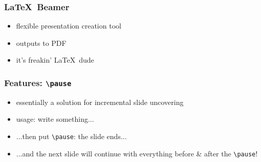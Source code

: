\newcommand{\cmdverb}[1]{\texttt{\textbackslash #1}}

\begin{frame}\frametitle{\LaTeX\ Beamer}
\begin{itemize}
    \item flexible presentation creation tool
    \item outputs to PDF
    \item it's freakin' \LaTeX\ dude
\end{itemize}
\end{frame}

\begin{frame}\frametitle{Features: \cmdverb{pause}}
\begin{itemize}
    \item essentially a solution for incremental slide uncovering
    \item usage: write something...
    \item ...then put \cmdverb{pause}: the slide ends...
    \pause
    \item ...and the next slide will continue with everything before \& after
        the \cmdverb{pause}!
\end{itemize}
\end{frame}
